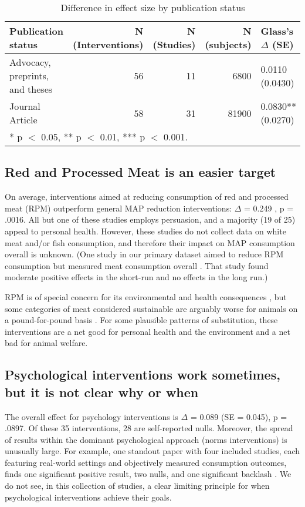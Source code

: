 \documentclass[sn-nature,referee,pdflatex]{sn-jnl}
\begin{document}
\begin{table}[!h]
\centering
\caption{\label{tab:table_three}Difference in effect size by publication status}
\centering
\begin{tabular}[t]{lrrrl}
\toprule
Publication status & N (Interventions) & N (Studies) & N (subjects) & Glass's $\Delta$ (SE)\\
\midrule
Advocacy, preprints, and theses & 56 & 11 & 6800 & 0.0110 (0.0430)\\
Journal Article & 58 & 31 & 81900 & 0.0830** (0.0270)\\
\bottomrule
\multicolumn{5}{l}{\rule{0pt}{1em}* p $<$ 0.05, ** p $<$ 0.01, *** p $<$ 0.001.}\\
\end{tabular}
\end{table}

\subsection{Red and Processed Meat is an easier target}\label{sec2.3}

On average, interventions aimed at reducing consumption of red and
processed meat (RPM) outperform general MAP reduction interventions:
\(\Delta\) = 0.249 , p = .0016. All but one of these
studies employs persuasion, and a majority (19 of 25) appeal to personal
health. However, these studies do not collect data on white meat and/or
fish consumption, and therefore their impact on MAP consumption overall
is unknown. (One study in our primary dataset aimed to reduce RPM
consumption but measured meat consumption overall \citep{shreedhar2021}.
That study found moderate positive effects in the short-run and no
effects in the long run.)

RPM is of special concern for its environmental and health consequences
\citep{grummon2023}, but some categories of meat considered sustainable
are arguably worse for animals on a pound-for-pound basis
\citep{mathur2022ethical}. For some plausible patterns of substitution,
these interventions are a net good for personal health and the
environment and a net bad for animal welfare.

\subsection{Psychological interventions work sometimes, but it is not
clear why or when}\label{sec2.4}

The overall effect for psychology interventions is \(\Delta\) = 0.089
(SE = 0.045), p = .0897. Of these 35 interventions, 28 are self-reported
nulls. Moreover, the spread of results within the dominant psychological
approach (norms interventions) is unusually large. For example, one
standout paper with four included studies, each featuring real-world
settings and objectively measured consumption outcomes, finds one
significant positive result, two nulls, and one significant backlash
\citep{sparkman2020}. We do not see, in this collection of studies, a
clear limiting principle for when psychological interventions achieve
their goals.
\end{document}

